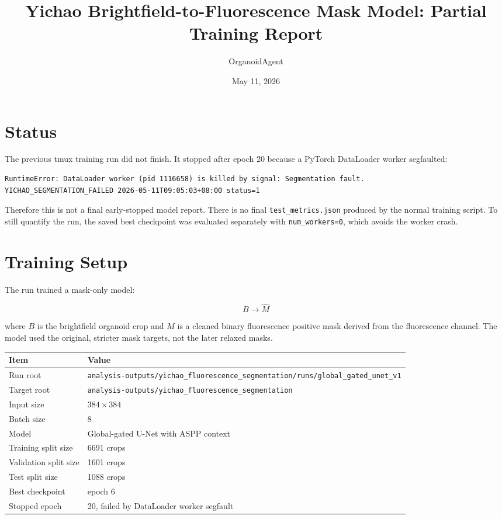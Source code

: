 \documentclass[11pt]{article}
\title{Yichao Brightfield-to-Fluorescence Mask Model: Partial Training Report}
\author{OrganoidAgent}
\date{May 11, 2026}
\begin{document}
\maketitle

\section{Status}

The previous tmux training run did not finish. It stopped after epoch 20 because a PyTorch
DataLoader worker segfaulted:

\begin{verbatim}
RuntimeError: DataLoader worker (pid 1116658) is killed by signal: Segmentation fault.
YICHAO_SEGMENTATION_FAILED 2026-05-11T09:05:03+08:00 status=1
\end{verbatim}

Therefore this is not a final early-stopped model report. There is no final
\texttt{test\_metrics.json} produced by the normal training script. To still quantify the
run, the saved best checkpoint was evaluated separately with \texttt{num\_workers=0}, which
avoids the worker crash.

\section{Training Setup}

The run trained a mask-only model:

\[
B \rightarrow \hat{M}
\]

where \(B\) is the brightfield organoid crop and \(M\) is a cleaned binary fluorescence
positive mask derived from the fluorescence channel. The model used the original, stricter
mask targets, not the later relaxed masks.

\begin{table}[H]
\centering
\begin{tabular}{ll}
\toprule
Item & Value \\
\midrule
Run root & \texttt{analysis-outputs/yichao\_fluorescence\_segmentation/runs/global\_gated\_unet\_v1} \\
Target root & \texttt{analysis-outputs/yichao\_fluorescence\_segmentation} \\
Input size & \(384 \times 384\) \\
Batch size & 8 \\
Model & Global-gated U-Net with ASPP context \\
Training split size & 6691 crops \\
Validation split size & 1601 crops \\
Test split size & 1088 crops \\
Best checkpoint & epoch 6 \\
Stopped epoch & 20, failed by DataLoader worker segfault \\
\bottomrule
\end{tabular}
\end{table}
\end{document}
